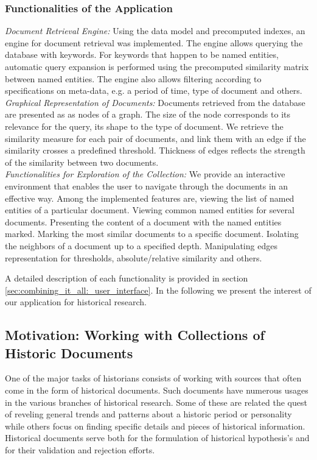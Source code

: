 \subsubsection{Functionalities of the Application}

\emph{Document Retrieval Engine:} Using the data model and precomputed indexes, an engine for document retrieval was implemented. The engine allows querying the database with keywords. For keywords that happen to be named entities, automatic query expansion is performed using the precomputed similarity matrix between named entities.  The engine also allows filtering according to specifications on meta-data, e.g. a period of time, type of document and others.\\ 
\emph{Graphical Representation of Documents:} Documents retrieved from the database are presented as as nodes of a graph. The size of the node corresponds to its relevance for the query, its shape to the type of document.  We retrieve the similarity measure for each pair of documents, and link them with an edge if the similarity crosses a predefined threshold. Thickness of edges reflects the strength of the similarity between two documents.\\
\emph{Functionalities for Exploration of the Collection:} We provide an interactive environment that enables the user to navigate through the documents in an effective way. Among the implemented features are, viewing the list of named entities of a particular document. Viewing common named entities for several documents. Presenting the content of a document with the named entities marked. Marking the most similar documents to a specific document. Isolating the neighbors of a document up to a specified depth. Manipulating edges representation for thresholds, absolute/relative similarity and others.

A detailed description of each functionality is provided in section \ref{sec:combining_it_all:_user_interface}. In the following we present the interest of our application for historical research. 

\subsection{Motivation: Working with Collections of Historic Documents}
\label{sec:motivation}
One of the major tasks of historians consists of working with sources that often come in the form of historical documents. 
Such documents have numerous usages in the various branches of historical research. Some of these are related the quest of reveling 
general trends and patterns about a historic period or personality while others focus on finding specific details and pieces of historical 
information. Historical documents serve both for the formulation of historical hypothesis's and for their validation and rejection efforts. 

